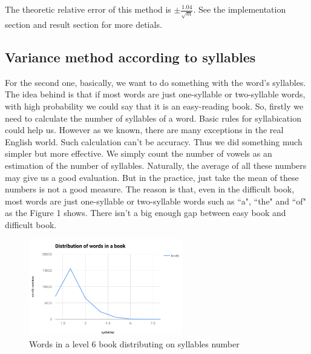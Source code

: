 \documentclass{article}
\begin{document}
		The theoretic relative error of this method is $\pm \frac{1.04}{\sqrt{m}}$. See the implementation section and result section for more detials.

	\subsection{Variance method according to syllables}
		For the second one, basically, we want to do something with the word's syllables. The idea behind is that
		if most words are just one-syllable or two-syllable words, with high probability we could say that it is an easy-reading book.
	\newline
	\newline
		So, firstly we need to calculate the number of syllables of a word. Basic rules for syllabication could help us. However as we known,
		there are many exceptions in the real English world. Such calculation can't be accuracy. Thus we did something much simpler but more
		effective. We simply count the number of vowels as an estimation of the number of syllables.
	\newline
	\newline
		Naturally, the average of all these numbers may give us a good evaluation. But in the practice, just take the mean of these numbers is not
		a good measure.
		The reason is that, even in the difficult book, most
		words are just one-syllable or two-syllable words such as ``a", ``the" and ``of" as the Figure 1 shows.
		There isn't a big enough gap between easy book and difficult book.

\begin{figure}[H]
\begin{center}
\includegraphics[width=0.6\textwidth]{wordsDistribution} 
\caption{Words in a level 6 book distributing on syllables number}
\end{center}
\end{figure}
\end{document}

